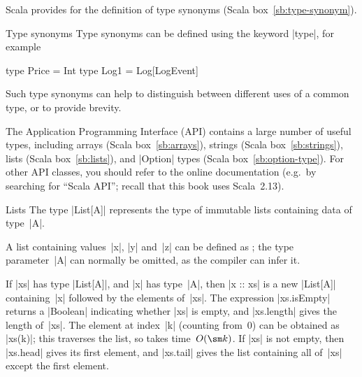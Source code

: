 
\pagebreak[3]

Scala provides for the definition of type synonyms (Scala
box~\ref{sb:type-synonym}). 

\begin{scalaBox}{Type synonyms}
\label{sb:type-synonym}
Type synonyms can be defined using the keyword |type|, for example
\begin{scala}
  type Price = Int
  type Log1 = Log[LogEvent]
\end{scala}
Such type synonyms can help to distinguish between different uses of a common
type, or to provide brevity. 
\end{scalaBox}

\pagebreak[3]

The Application Programming Interface (API) contains a large number of useful
types, including arrays (Scala box~\ref{sb:arrays}), strings (Scala
box~\ref{sb:strings}), lists (Scala box~\ref{sb:lists}), and |Option| types
(Scala box~\ref{sb:option-type}).  For other API classes, you should refer to
the online documentation (e.g.~by searching for ``Scala
API''; recall that this book uses Scala~2.13).


\begin{scalaBox}{Lists}
\label{sb:lists}
The type |List[A]| represents the type of immutable lists containing data of
type~|A|.

A list containing values~|x|, |y| and~|z| can be defined as ; the type parameter~|A| can normally be omitted, as the compiler can
infer it.

If |xs| has type |List[A]|, and |x| has type~|A|, then |x :: xs| is a new
|List[A]| containing~|x| followed by the elements of~|xs|.  The expression
|xs.isEmpty| returns a |Boolean| indicating whether |xs| is empty, and
|xs.length| gives the length of~|xs|.  The element at index~|k| (counting
from~0) can be obtained as |xs(k)|; this traverses the list, so takes
time~$O(\sm k)$.  If |xs| is not empty, then |xs.head| gives its first
element, and |xs.tail| gives the list containing all of~|xs| except the first
element.
\end{scalaBox}


